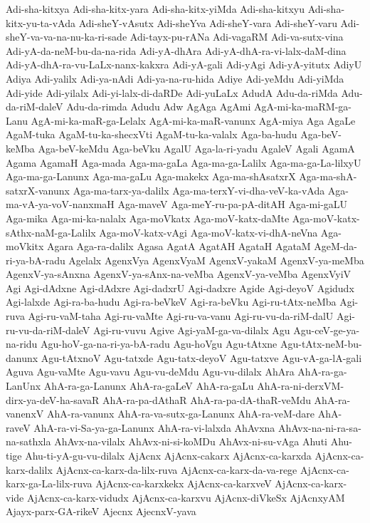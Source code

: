 {Adi-sha-kitxya
Adi-sha-kitx-yara
Adi-sha-kitx-yiMda
Adi-sha-kitxyu
Adi-sha-kitx-yu-ta-vAda
Adi-sheY-vAsutx
Adi-sheYva
Adi-sheY-vara
Adi-sheY-varu
Adi-sheY-va-va-na-nu-ka-ri-sade
Adi-tayx-pu-rANa
Adi-vagaRM
Adi-va-sutx-vina
Adi-yA-da-neM-bu-da-na-rida
Adi-yA-dhAra
Adi-yA-dhA-ra-vi-lalx-daM-dina
Adi-yA-dhA-ra-vu-LaLx-nanx-kakxra
Adi-yA-gali
Adi-yAgi
Adi-yA-yitutx
AdiyU
Adiya
Adi-yalilx
Adi-ya-nAdi
Adi-ya-na-ru-hida
Adiye
Adi-yeMdu
Adi-yiMda
Adi-yide
Adi-yilalx
Adi-yi-lalx-di-daRDe
Adi-yuLaLx
AdudA
Adu-da-riMda
Adu-da-riM-daleV
Adu-da-rimda
Adudu
Adw
AgAga
AgAmi
AgA-mi-ka-maRM-ga-Lanu
AgA-mi-ka-maR-ga-Lelalx
AgA-mi-ka-maR-vanunx
AgA-miya
Aga
AgaLe
AgaM-tuka
AgaM-tu-ka-shecxVti
AgaM-tu-ka-valalx
Aga-ba-hudu
Aga-beV-keMba
Aga-beV-keMdu
Aga-beVku
AgalU
Aga-la-ri-yadu
AgaleV
Agali
AgamA
Agama
AgamaH
Aga-mada
Aga-ma-gaLa
Aga-ma-ga-Lalilx
Aga-ma-ga-La-lilxyU
Aga-ma-ga-Lanunx
Aga-ma-gaLu
Aga-makekx
Aga-ma-shAsatxrX
Aga-ma-shA-satxrX-vanunx
Aga-ma-tarx-ya-dalilx
Aga-ma-terxY-vi-dha-veV-ka-vAda
Aga-ma-vA-ya-voV-nanxmaH
Aga-maveV
Aga-meY-ru-pa-pA-ditAH
Aga-mi-gaLU
Aga-mika
Aga-mi-ka-nalalx
Aga-moVkatx
Aga-moV-katx-daMte
Aga-moV-katx-sAthx-naM-ga-Lalilx
Aga-moV-katx-vAgi
Aga-moV-katx-vi-dhA-neVna
Aga-moVkitx
Agara
Aga-ra-dalilx
Agasa
AgatA
AgatAH
AgataH
AgataM
AgeM-da-ri-ya-bA-radu
Agelalx
AgenxVya
AgenxVyaM
AgenxV-yakaM
AgenxV-ya-meMba
AgenxV-ya-sAnxna
AgenxV-ya-sAnx-na-veMba
AgenxV-ya-veMba
AgenxVyiV
Agi
Agi-dAdxne
Agi-dAdxre
Agi-dadxrU
Agi-dadxre
Agide
Agi-deyoV
Agidudx
Agi-lalxde
Agi-ra-ba-hudu
Agi-ra-beVkeV
Agi-ra-beVku
Agi-ru-tAtx-neMba
Agi-ruva
Agi-ru-vaM-taha
Agi-ru-vaMte
Agi-ru-va-vanu
Agi-ru-vu-da-riM-dalU
Agi-ru-vu-da-riM-daleV
Agi-ru-vuvu
Agive
Agi-yaM-ga-va-dilalx
Agu
Agu-ceV-ge-ya-na-ridu
Agu-hoV-ga-na-ri-ya-bA-radu
Agu-hoVgu
Agu-tAtxne
Agu-tAtx-neM-bu-danunx
Agu-tAtxnoV
Agu-tatxde
Agu-tatx-deyoV
Agu-tatxve
Agu-vA-ga-lA-gali
Aguva
Agu-vaMte
Agu-vavu
Agu-vu-deMdu
Agu-vu-dilalx
AhAra
AhA-ra-ga-LanUnx
AhA-ra-ga-Lanunx
AhA-ra-gaLeV
AhA-ra-gaLu
AhA-ra-ni-derxVM-dirx-ya-deV-ha-savaR
AhA-ra-pa-dAthaR
AhA-ra-pa-dA-thaR-veMdu
AhA-ra-vanenxV
AhA-ra-vanunx
AhA-ra-va-sutx-ga-Lanunx
AhA-ra-veM-dare
AhA-raveV
AhA-ra-vi-Sa-ya-ga-Lanunx
AhA-ra-vi-lalxda
AhAvxna
AhAvx-na-ni-ra-sa-na-sathxla
AhAvx-na-vilalx
AhAvx-ni-si-koMDu
AhAvx-ni-su-vAga
Ahuti
Ahu-tige
Ahu-ti-yA-gu-vu-dilalx
AjAcnx
AjAcnx-cakarx
AjAcnx-ca-karxda
AjAcnx-ca-karx-dalilx
AjAcnx-ca-karx-da-lilx-ruva
AjAcnx-ca-karx-da-va-rege
AjAcnx-ca-karx-ga-La-lilx-ruva
AjAcnx-ca-karxkekx
AjAcnx-ca-karxveV
AjAcnx-ca-karx-vide
AjAcnx-ca-karx-vidudx
AjAcnx-ca-karxvu
AjAcnx-diVkeSx
AjAcnxyAM
Ajayx-parx-GA-rikeV
Ajecnx
AjecnxV-yava
}
